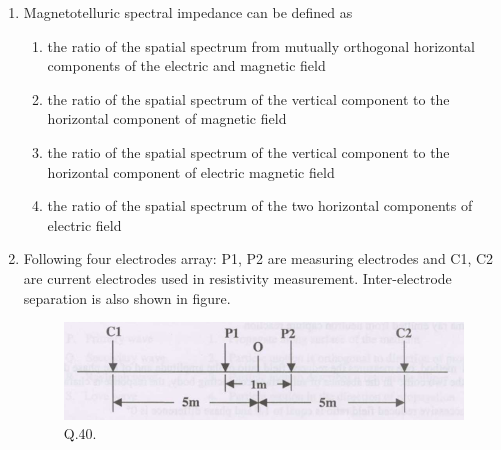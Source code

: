 \documentclass[journal,12pt,onecolumn]{IEEEtran}
\theoremstyle{remark}
\begin{document}
\begin{enumerate}[start = 21]
\begin {enumerate}
            \end{enumerate}
    \item Magnetotelluric spectral impedance can be defined as \hfill{} 
            \begin{enumerate}
                \item the ratio of the spatial spectrum from mutually orthogonal horizontal components of the electric and magnetic field
                \item the ratio of the spatial spectrum of the vertical component to the horizontal component of magnetic field
                \item the ratio of the spatial spectrum of the vertical component to the horizontal component of electric magnetic field
                \item the ratio of the spatial spectrum of the two horizontal components of electric field                 
            \end{enumerate}
    \item Following four electrodes array: P1, P2 are measuring electrodes and C1, C2 are current electrodes used in resistivity measurement. Inter-electrode separation is also shown in figure.\hfill{} 
    \begin{figure}[H]
        \centering
        \includegraphics[width=1\columnwidth]{figs/IMG-3_2009.png}
        \caption{Q.40.}
        \label{fig:placeholder}
    \end{figure}
   

\end{enumerate}
\end{document}
